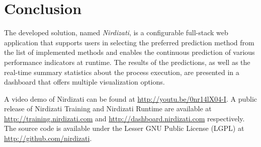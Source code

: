 \documentclass[runningheads,a4paper]{llncs}
\begin{document}
\section{Conclusion} \label{sec:conclusion}
The developed solution, named \emph{Nirdizati}, is a configurable full-stack web application that supports users in selecting the preferred prediction method from the list of implemented methods and enables the continuous prediction of various performance indicators at runtime.
The results of the predictions, as well as the real-time summary statistics about the process execution, are presented in a dashboard that offers multiple visualization options.

A video demo of Nirdizati can be found at \url{http://youtu.be/0nr14lX04-I}. A public release of Nirdizati Training and Nirdizati Runtime are available at \url{http://training.nirdizati.com} and \url{http://dashboard.nirdizati.com} respectively. The source code is available under the Lesser GNU Public License (LGPL) at \url{http://github.com/nirdizati}. 


\end{document}
